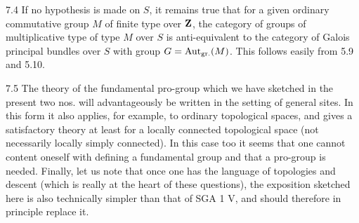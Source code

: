 \begin{remark}{7.4}\label{X.7.4}
If no hypothesis is made on $S$, it remains true that for a given ordinary commutative group $M$ of finite type over $\mathbf{Z}$, the category of groups of multiplicative type of type $M$ over $S$ is anti-equivalent to the category of Galois principal bundles over $S$ with group $G=\operatorname{Aut}_{\mathrm{gr.}}(M)$. This follows easily from 5.9 and 5.10.
\end{remark}
\begin{remark}{7.5}\label{X.7.5}
The theory of the fundamental pro-group which we have sketched in the present two nos. will advantageously be written in the setting of general sites. In this form it also applies, for example, to ordinary topological spaces, and gives a satisfactory theory at least for a locally connected topological space (not necessarily locally simply connected). In this case too it seems that one cannot content oneself with defining a fundamental group and that a pro-group is needed. Finally, let us note that once one has the language of topologies and descent (which is really at the heart of these questions), the exposition sketched here is also technically simpler than that of SGA 1 V, and should therefore in principle replace it.
\end{remark}

